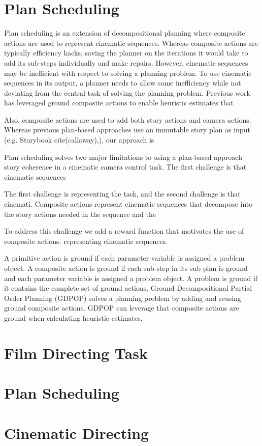 \documentclass[letterpaper]{article}
\begin{document}
\section{Plan Scheduling}

Plan scheduling is an extension of decompositional planning where composite actions are used to represent cinematic sequences. Whereas composite actions are typically efficiency hacks, saving the planner on the iterations it would take to add its sub-steps individually and make repairs. However, cinematic sequences may be inefficient with respect to solving a planning problem. To use cinematic sequences in its output, a planner needs to allow some inefficiency while not deviating from the central task of solving the planning problem. Previous work has leveraged ground composite actions to enable heuristic estimates that 

Also, composite actions are used to add both story actions and camera actions. Whereas previous plan-based approaches use an immutable story plan as input (e.g. Storybook cite(callaway),\cite{jhala2010cinematic}), our approach is 

Plan scheduling solves two major limitations to using a plan-based approach story coherence in a cinematic camera control task. The first challenge is that cinematic sequences 

The first challenge is representing the task, and the second challenge is that cinemati. Composite actions represent cinematic sequences that decompose into the story actions needed in the sequence and the 

 To address this challenge we add a reward function that motivates the use of composite actions. representing cinematic sequences.

A primitive action is ground if each parameter variable is assigned a problem object. A composite action is ground if each sub-step in its sub-plan is ground and each parameter variable is assigned a problem object. A problem is ground if it contains the complete set of ground actions. Ground Decompositional Partial Order Planning (GDPOP) solves a planning problem by adding and reusing ground composite actions. GDPOP can leverage that composite actions are ground when calculating heuristic estimates. 

\section{Film Directing Task}





\section{Plan Scheduling}

\section{Cinematic Directing}




\end{document}
